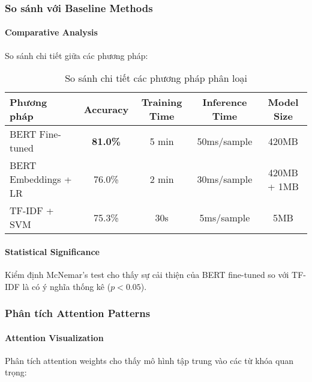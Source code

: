 \subsubsection{So sánh với Baseline Methods}

\paragraph{Comparative Analysis}
So sánh chi tiết giữa các phương pháp:

\begin{table}[H]
\centering
\caption{So sánh chi tiết các phương pháp phân loại}
\label{tab:detailed_comparison}
\begin{tabular}{lcccc}
\toprule
\textbf{Phương pháp} & \textbf{Accuracy} & \textbf{Training Time} & \textbf{Inference Time} & \textbf{Model Size} \\
\midrule
BERT Fine-tuned & \textbf{81.0\%} & 5 min & 50ms/sample & 420MB \\
BERT Embeddings + LR & 76.0\% & 2 min & 30ms/sample & 420MB + 1MB \\
TF-IDF + SVM & 75.3\% & 30s & 5ms/sample & 5MB \\
\bottomrule
\end{tabular}
\end{table}

\paragraph{Statistical Significance}
Kiểm định McNemar's test cho thấy sự cải thiện của BERT fine-tuned so với TF-IDF là có ý nghĩa thống kê ($p < 0.05$).

\subsubsection{Phân tích Attention Patterns}

\paragraph{Attention Visualization}
Phân tích attention weights cho thấy mô hình tập trung vào các từ khóa quan trọng:

